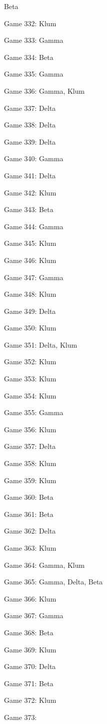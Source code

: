 \documentclass{article}
\begin{document}
\begin{multicols}{3}
\begin{compactitem}
Beta
\item Game 332:
Klum
\item Game 333:
Gamma
\item Game 334:
Beta
\item Game 335:
Gamma
\item Game 336:
Gamma, Klum
\item Game 337:
Delta
\item Game 338:
Delta
\item Game 339:
Delta
\item Game 340:
Gamma
\item Game 341:
Delta
\item Game 342:
Klum
\item Game 343:
Beta
\item Game 344:
Gamma
\item Game 345:
Klum
\item Game 346:
Klum
\item Game 347:
Gamma
\item Game 348:
Klum
\item Game 349:
Delta
\item Game 350:
Klum
\item Game 351:
Delta, Klum
\item Game 352:
Klum
\item Game 353:
Klum
\item Game 354:
Klum
\item Game 355:
Gamma
\item Game 356:
Klum
\item Game 357:
Delta
\item Game 358:
Klum
\item Game 359:
Klum
\item Game 360:
Beta
\item Game 361:
Beta
\item Game 362:
Delta
\item Game 363:
Klum
\item Game 364:
Gamma, Klum
\item Game 365:
Gamma, Delta, Beta
\item Game 366:
Klum
\item Game 367:
Gamma
\item Game 368:
Beta
\item Game 369:
Klum
\item Game 370:
Delta
\item Game 371:
Beta
\item Game 372:
Klum
\item Game 373:

\end{compactitem}
\end{multicols}
\end{document}
